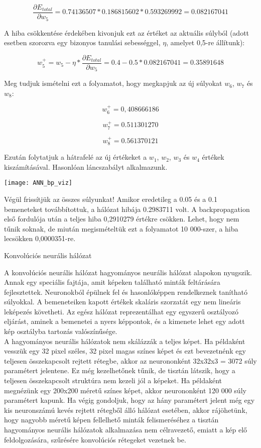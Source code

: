 \[\frac{\partial E_{total}}{\partial w_{5}} = 0.74136507 * 0.186815602 * 0.593269992 = 0.082167041\]

A hiba csökkentése érdekében kivonjuk ezt az értéket az aktuális súlyból (adott esetben szorozva egy bizonyos tanulási sebességgel, $\eta$, amelyet 0,5-re állítunk):

\[w_5^{+} = w_5 - \eta * \frac{\partial E_{total}}{\partial w_{5}} = 0.4 - 0.5 * 0.082167041 = 0.35891648\]

Meg tudjuk ismételni ezt a folyamatot, hogy megkapjuk az új súlyokat $w_6$, $w_7$ és $w_8$:

\[w_6 ^ {+} = 0,408666186\]

\[w_7 ^ {+} = 0.511301270\]

\[w_8 ^ {+} = 0.561370121\]

Ezután folytatjuk a hátrafelé az új értékeket a $w_1$, $w_2$, $w_3$ és $w_4$ értékek kiszámításával. Hasonlóan láncszabályt alkalmazunk.\\

\begin{center}
\texttt{[image: ANN\_bp\_viz]}
\end{center}

Végül frissítjük az összes súlyunkat! Amikor eredetileg a 0.05 és a 0.1 bemeneteket továbbítottuk, a hálózat hibája 0.2983711 volt. A backpropagation első fordulója után a teljes hiba 0,2910279 értékre csökken. Lehet, hogy nem tűnik soknak, de miután megismételtük ezt a folyamatot 10 000-szer, a hiba lecsökken 0,0000351-re.\\

\begin{flushleft}
{\Large Konvolúciós neurális hálózat}\\
\end{flushleft}

A konvolúciós neurális hálózat hagyományos neurális hálózat alapokon nyugszik. Annak egy speciális fajtája, amit képeken található minták feltárására fejlesztettek. Neuronokból épülnek fel és hasonlóképpen rendelkeznek tanítható súlyokkal. A bemeneteiken kapott értékek skaláris szorzatát egy nem lineáris leképezés követheti. Az egész hálózat reprezentálhat egy egyszerű osztályozó eljárást, aminek a bemenetei a nyers képpontok, és a kimenete lehet egy adott kép osztályba tartozás valószínűsége.\\

A hagyományos neurális hálózatok nem skálázzák a teljes képet. Ha példaként vesszük egy 32 pixel széles, 32 pixel magas színes képet és ezt bevezetnénk egy teljesen összekapcsolt rejtett rétegbe, akkor az neurononként 32x32x3 = 3072 súly paramétert jelentene. Ez még kezelhetőnek tűnik, de tisztán látszik, hogy a teljesen összekapcsolt struktúra nem kezeli jól a képeket. Ha példaként megnézünk egy 200x200 méretű színes képet, akkor neurononként 120 000 súly paramétert kapunk. Ha végig gondoljuk, hogy az hány paramétert jelent még egy kis neuronszámú kevés rejtett rétegből álló hálózat esetében, akkor rájöhetünk, hogy nagyobb méretű képen fellelhető minták felismeréséhez a tisztán hagyományos neurális hálózatok alkalmazása nem célravezető, emiatt a kép elő feldolgozására, szűrésére konvolúciós rétegeket vezetnek be.

